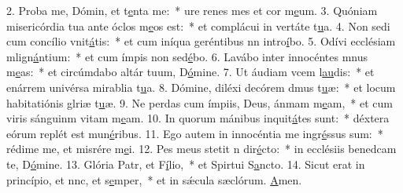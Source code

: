 2. Proba me, Dómin, et t\uline{e}nta me:~* ure renes mes et cor m\uline{e}um.
3. Quóniam misericórdia tua ante óclos m\uline{e}os est:~* et complácui in vertáte t\uline{u}a.
4. Non sedi cum concílio vnit\uline{á}tis:~* et cum iníqua geréntibus nn intro\uline{í}bo.
5. Odívi ecclésiam mlign\uline{á}ntium:~* et cum ímpis non sed\uline{é}bo.
6. Lavábo inter innocéntes mnus m\uline{e}as:~* et circúmdabo altár tuum, D\uline{ó}mine.
7. Ut áudiam vcem l\uline{au}dis:~* et enárrem univérsa mirablia t\uline{u}a.
8. Dómine, diléxi decórem dmus t\uline{u}æ:~* et locum habitatiónis glriæ t\uline{u}æ.
9. Ne perdas cum ímpiis, Deus, ánmam m\uline{e}am,~* et cum viris sánguinm vitam m\uline{e}am.
10. In quorum mánibus inquit\uline{á}tes sunt:~* déxtera eórum replét est mun\uline{é}ribus.
11. Ego autem in innocéntia me ingr\uline{é}ssus sum:~* rédime me, et misrére m\uline{e}i.
12. Pes meus stetit n dir\uline{é}cto:~* in ecclésiis benedcam te, D\uline{ó}mine.
13. Glória Patr, et F\uline{í}lio,~* et Spirtui S\uline{a}ncto.
14. Sicut erat in princípio, et nnc, et s\uline{e}mper,~* et in sǽcula sæclórum. \uline{A}men.
